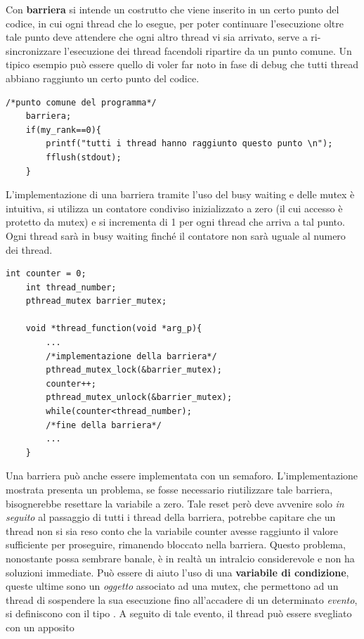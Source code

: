 \documentclass[10pt, letterpaper]{report}
\begin{document}
Con \textbf{barriera} si intende un costrutto che viene inserito in un certo punto del codice, in cui 
ogni thread che lo esegue, per poter continuare l'esecuzione oltre tale punto deve attendere che ogni altro thread 
vi sia arrivato, serve a ri-sincronizzare l'esecuzione dei thread facendoli ripartire da un punto comune. Un tipico esempio 
può essere quello di voler far noto in fase di debug che tutti thread abbiano raggiunto un certo punto del codice.
\begin{lstlisting}[style=CStyle]
    /*punto comune del programma*/
    barriera;
    if(my_rank==0){
        printf("tutti i thread hanno raggiunto questo punto \n");
        fflush(stdout);
    }
\end{lstlisting}
L'implementazione di una barriera tramite l'uso del busy waiting e delle mutex è intuitiva, 
si utilizza un contatore condiviso inizializzato a zero (il cui accesso è protetto da mutex) e si incrementa di 1 
per ogni thread che arriva a tal punto. Ogni thread sarà in busy waiting finché il contatore non sarà uguale al 
numero dei thread.
\begin{lstlisting}[style=CStyle]
    int counter = 0;
    int thread_number;
    pthread_mutex barrier_mutex;

    void *thread_function(void *arg_p){
        ...
        /*implementazione della barriera*/
        pthread_mutex_lock(&barrier_mutex);
        counter++;
        pthread_mutex_unlock(&barrier_mutex);
        while(counter<thread_number);
        /*fine della barriera*/
        ...
    }
\end{lstlisting}
Una barriera può anche essere implementata con un semaforo. L'implementazione mostrata presenta un problema, 
se fosse necessario riutilizzare tale barriera, bisognerebbe resettare la variabile  a 
zero. Tale reset però deve avvenire solo \textit{in seguito} al passaggio di tutti i thread 
della barriera, potrebbe capitare che un thread non si sia reso conto che la variabile counter 
avesse raggiunto il valore sufficiente per proseguire, rimanendo bloccato nella barriera. Questo problema, 
nonostante possa sembrare banale, è in realtà un intralcio considerevole e non ha soluzioni immediate.\acc 
Può essere di aiuto l'uso di una \textbf{variabile di condizione}, queste ultime sono un \textit{oggetto} 
associato ad una mutex, che permettono ad un thread di sospendere la sua esecuzione fino all'accadere di un 
determinato \textit{evento}, si definiscono con il tipo 
. A seguito di tale evento, il thread può essere svegliato con un apposito 
\end{document}
